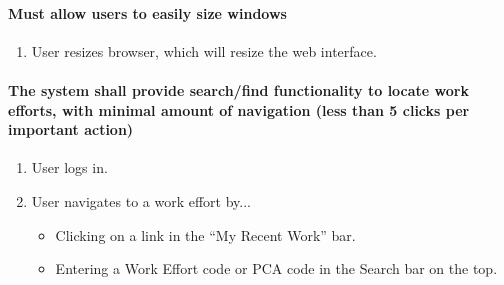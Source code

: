 \documentclass[letterpaper]{article}
\begin{document}
\paragraph{Must allow users to easily size windows}
\begin{enumerate}
\item User resizes browser, which will resize the web interface.
\end{enumerate}

\paragraph{The system shall provide search/find functionality to locate work efforts, with minimal amount of navigation (less than 5 clicks per important action)}
\begin{enumerate}
\item User logs in.
\item User navigates to a work effort by...
\begin{itemize}
  \item Clicking on a link in the ``My Recent Work'' bar.
  \item Entering a Work Effort code or PCA code in the Search bar on the top.
    \end{itemize}
\end{enumerate}
\end{document}
